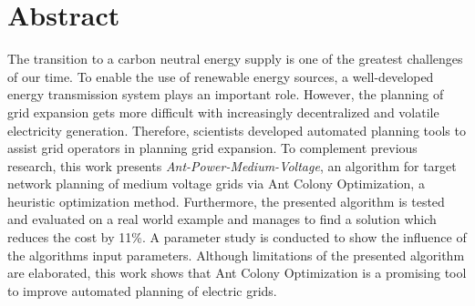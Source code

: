 \chapter*{Abstract}
The transition to a carbon neutral energy supply is one of the greatest challenges of our time. To enable the use of renewable energy sources, a well-developed energy transmission system plays an important role. However, the planning of grid expansion gets more difficult with increasingly decentralized and volatile electricity generation. Therefore, scientists developed automated planning tools to assist grid operators in planning grid expansion. To complement previous research, this work presents \textit{Ant-Power-Medium-Voltage}, an algorithm for target network planning of medium voltage grids via Ant Colony Optimization, a heuristic optimization method. Furthermore, the presented algorithm is tested and evaluated on a real world example and manages to find a solution which reduces the cost by 11\%. A parameter study is conducted to show the influence of the algorithms input parameters. Although limitations of the presented algorithm are elaborated, this work shows that Ant Colony Optimization is a promising tool to improve automated planning of electric grids.

